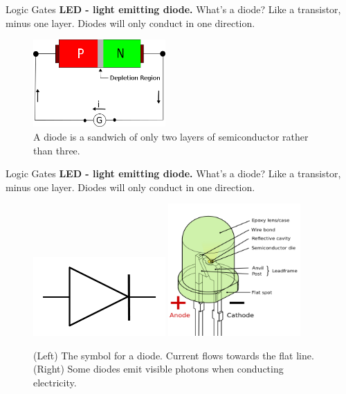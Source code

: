 \documentclass{beamer}
\begin{document}
\begin{frame}{Logic Gates}
\textbf{LED - light emitting diode.}  What's a diode?  Like a transistor, minus one layer.  Diodes will only conduct in one direction.
\begin{figure}
\centering
\includegraphics[width=0.45\textwidth]{figures/diode.png}
\caption{\label{fig:diode} A diode is a sandwich of only two layers of semiconductor rather than three.}
\end{figure}
\end{frame}

\begin{frame}{Logic Gates}
\textbf{LED - light emitting diode.}  What's a diode?  Like a transistor, minus one layer.  Diodes will only conduct in one direction.
\begin{figure}
\centering
\includegraphics[width=0.45\textwidth]{figures/Diode.pdf}
\includegraphics[width=0.45\textwidth]{figures/LED.png}
\caption{\label{fig:diode2} (Left) The symbol for a diode.  Current flows towards the flat line. (Right) Some diodes emit visible photons when conducting electricity.}
\end{figure}
\end{frame}
\end{document}
